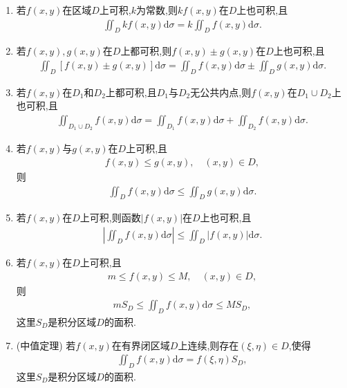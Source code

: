 \documentclass[../../main.tex]{subfiles}%
\begin{document}
\begin{theorem}
\begin{enumerate}[(1)]
\item 若$f(x,y)$在区域$D$上可积,$k$为常数,则$kf(x,y)$在$D$上也可积,且
\begin{align*}
\iint_D kf(x,y)\mathrm{d}\sigma = k\iint_D f(x,y)\mathrm{d}\sigma.
\end{align*}

\item 若$f(x,y),g(x,y)$在$D$上都可积,则$f(x,y) \pm g(x,y)$在$D$上也可积,且
\begin{align*}
\iint_D [f(x,y) \pm g(x,y)]\mathrm{d}\sigma = \iint_D f(x,y)\mathrm{d}\sigma \pm \iint_D g(x,y)\mathrm{d}\sigma.
\end{align*}

\item 若$f(x,y)$在$D_1$和$D_2$上都可积,且$D_1$与$D_2$无公共内点,则$f(x,y)$在$D_1 \cup D_2$上也可积,且
\begin{align*}
\iint_{D_1 \cup D_2} f(x,y)\mathrm{d}\sigma = \iint_{D_1} f(x,y)\mathrm{d}\sigma + \iint_{D_2} f(x,y)\mathrm{d}\sigma.
\end{align*}

\item 若$f(x,y)$与$g(x,y)$在$D$上可积,且
\begin{align*}
f(x,y) \leqslant g(x,y),\quad (x,y) \in D,
\end{align*}
则
\begin{align*}
\iint_D f(x,y)\mathrm{d}\sigma \leqslant \iint_D g(x,y)\mathrm{d}\sigma.
\end{align*}

\item 若$f(x,y)$在$D$上可积,则函数$|f(x,y)|$在$D$上也可积,且
\begin{align*}
\left| \iint_D f(x,y)\mathrm{d}\sigma \right| \leqslant \iint_D |f(x,y)|\mathrm{d}\sigma.
\end{align*}

\item 若$f(x,y)$在$D$上可积,且
\begin{align*}
m \leqslant f(x,y) \leqslant M,\quad (x,y) \in D,
\end{align*}
则
\begin{align*}
mS_D \leqslant \iint_D f(x,y)\mathrm{d}\sigma \leqslant MS_D,
\end{align*}
这里$S_D$是积分区域$D$的面积.

\item\label{theorem:二重积分中值定理} (中值定理) 若$f(x,y)$在有界闭区域$D$上连续,则存在$(\xi,\eta) \in D$,使得
\begin{align*}
\iint_D f(x,y)\mathrm{d}\sigma = f(\xi,\eta)S_D,
\end{align*}
这里$S_D$是积分区域$D$的面积.
\end{enumerate}
\end{theorem}
\end{document}
